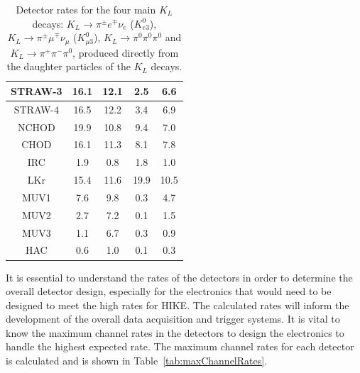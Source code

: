 \documentclass[../../main.tex]{subfiles}
\begin{document}
\begin{table}[htbp]
{\begin{tabular}{|c|ccll}
            STRAW-3 & \multicolumn{1}{c|}{16.1} & \multicolumn{1}{c|}{12.1} & \multicolumn{1}{c|}{2.5} & \multicolumn{1}{c|}{6.6} \\ \hline
            STRAW-4 & \multicolumn{1}{c|}{16.5} & \multicolumn{1}{c|}{12.2} & \multicolumn{1}{c|}{3.4} & \multicolumn{1}{c|}{6.9} \\ \hline
            NCHOD & \multicolumn{1}{c|}{19.9} & \multicolumn{1}{c|}{10.8} & \multicolumn{1}{c|}{9.4} & \multicolumn{1}{c|}{7.0} \\ \hline
            CHOD & \multicolumn{1}{c|}{16.1} & \multicolumn{1}{c|}{11.3} & \multicolumn{1}{c|}{8.1} & \multicolumn{1}{c|}{7.8} \\ \hline
            IRC & \multicolumn{1}{c|}{1.9} & \multicolumn{1}{c|}{0.8} & \multicolumn{1}{c|}{1.8} & \multicolumn{1}{c|}{1.0} \\ \hline
            LKr & \multicolumn{1}{c|}{15.4} & \multicolumn{1}{c|}{11.6} & \multicolumn{1}{c|}{19.9} & \multicolumn{1}{c|}{10.5} \\ \hline
            MUV1 & \multicolumn{1}{c|}{7.6} & \multicolumn{1}{c|}{9.8} & \multicolumn{1}{c|}{0.3} & \multicolumn{1}{c|}{4.7} \\ \hline
            MUV2 & \multicolumn{1}{c|}{2.7} & \multicolumn{1}{c|}{7.2} & \multicolumn{1}{c|}{0.1} & \multicolumn{1}{c|}{1.5} \\ \hline
            MUV3 & \multicolumn{1}{c|}{1.1} & \multicolumn{1}{c|}{6.7} & \multicolumn{1}{c|}{0.3} & \multicolumn{1}{c|}{0.9} \\ \hline
            HAC & \multicolumn{1}{c|}{0.6} & \multicolumn{1}{c|}{1.0} & \multicolumn{1}{c|}{0.1} & \multicolumn{1}{c|}{0.3} \\ \hline
            \end{tabular}
        }
        \caption{Detector rates for the four main $K_L$ decays: $ K_L \to \pi^{\pm} e^{\mp} \nu_e$ ($K_{e3}^{0}$), $ K_L \to \pi^{\pm} \mu^{\mp} \nu_{\mu}$ ($K_{\mu 3}^{0}$), $ K_L \to \pi^{0} \pi^{0} \pi^{0}$ and $ K_L \to \pi^{+} \pi^{-} \pi^{0}$, produced directly from the daughter particles of the $K_L$ decays.}%
        \label{tab:DecayParticleRatesDetectors}
    \end{table}
    
    It is essential to understand the rates of the detectors in order to determine the overall detector design, especially for the electronics that would need to be designed to meet the high rates for \gls{HIKE}. The calculated rates will inform the development of the overall data acquisition and trigger systems. It is vital to know the maximum channel rates in the detectors to design the electronics to handle the highest expected rate. The maximum channel rates for each detector is calculated and is shown in Table~\ref{tab:maxChannelRates}. 
\end{document}
